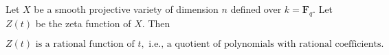 Let $X$ be a smooth projective variety of dimension $n$ defined over $k = \mathbf{F}_q$. Let $Z(t)$ be the zeta function of $X$. Then

$$Z(t) \text{ is a rational function of } t, \text{ i.e., a quotient of polynomials with rational coefficients}.$$